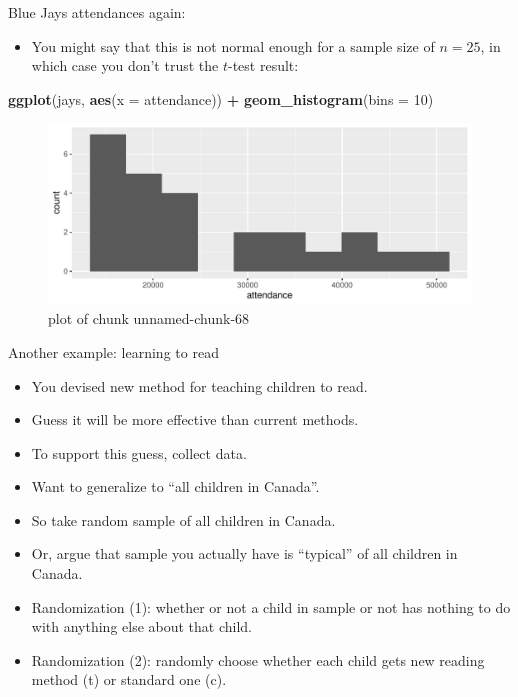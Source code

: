 \documentclass[ignorenonframetext,]{beamer}
\newenvironment{Shaded}{\begin{snugshade}}{\end{snugshade}}
\newcommand{\DataTypeTok}[1]{\textcolor[rgb]{0.13,0.29,0.53}{#1}}
\newcommand{\DecValTok}[1]{\textcolor[rgb]{0.00,0.00,0.81}{#1}}
\newcommand{\KeywordTok}[1]{\textcolor[rgb]{0.13,0.29,0.53}{\textbf{#1}}}
\newcommand{\NormalTok}[1]{#1}
\newcommand{\OperatorTok}[1]{\textcolor[rgb]{0.81,0.36,0.00}{\textbf{#1}}}
\newcommand{\StringTok}[1]{\textcolor[rgb]{0.31,0.60,0.02}{#1}}
\providecommand{\tightlist}{%
  \setlength{\itemsep}{0pt}\setlength{\parskip}{0pt}}
\begin{document}
\begin{frame}[fragile]{Blue Jays attendances again:}
\protect\hypertarget{blue-jays-attendances-again}{}

\begin{itemize}
\tightlist
\item
  You might say that this is not normal enough for a sample size of
  \(n = 25\), in which case you don't trust the \(t\)-test result:
\end{itemize}

\begin{Shaded}
\begin{Highlighting}[]
\KeywordTok{ggplot}\NormalTok{(jays, }\KeywordTok{aes}\NormalTok{(}\DataTypeTok{x =}\NormalTok{ attendance)) }\OperatorTok{+}\StringTok{ }\KeywordTok{geom_histogram}\NormalTok{(}\DataTypeTok{bins =} \DecValTok{10}\NormalTok{)}
\end{Highlighting}
\end{Shaded}

\begin{figure}
\centering
\includegraphics{figure/unnamed-chunk-68-1.pdf}
\caption{plot of chunk unnamed-chunk-68}
\end{figure}

\end{frame}

\begin{frame}{Another example: learning to read}
\protect\hypertarget{another-example-learning-to-read}{}

\begin{itemize}
\tightlist
\item
  You devised new method for teaching children to read.
\item
  Guess it will be more effective than current methods.
\item
  To support this guess, collect data.
\item
  Want to generalize to ``all children in Canada''.
\item
  So take random sample of all children in Canada.
\item
  Or, argue that sample you actually have is ``typical'' of all children
  in Canada.
\item
  Randomization (1): whether or not a child in sample or not has nothing
  to do with anything else about that child.
\item
  Randomization (2): randomly choose whether each child gets new reading
  method (t) or standard one (c).
\end{itemize}

\end{frame}
\end{document}
